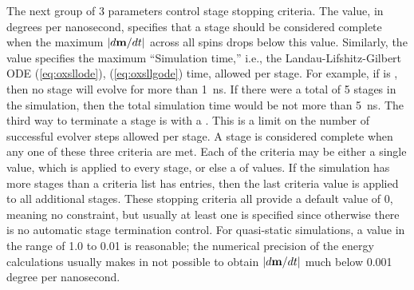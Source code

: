 \begin{description}
The next group of 3 parameters control stage stopping criteria.  The
 value, in degrees per nanosecond, specifies that a
stage should be considered complete when the maximum $|d\textbf{m}/dt|$ across
all spins drops below this value.  Similarly, the
 value specifies the maximum ``Simulation
time,'' i.e., the Landau-Lifshitz-Gilbert ODE (\ref{eq:oxsllode}),
(\ref{eq:oxsllgode}) time, allowed per stage.  For example, if
 is
, then no stage will evolve for more than
1~ns.  If there were a total of 5 stages in the simulation, then the
total simulation time would be not more than 5~ns.  The third way to
terminate a stage is with a .  This is
a limit on the number of successful evolver steps allowed per stage.  A
stage is considered complete when any one of these three criteria are
met.  Each of the criteria may be either a single value, which is
applied to every stage, or else a
 of values.  If the
simulation has more stages than a criteria list has entries, then the
last criteria value is applied to all additional stages.  These stopping
criteria all provide a default value of 0, meaning no constraint, but
usually at least one is specified since otherwise there is no automatic
stage termination control.  For quasi-static simulations, a
 value in the range of 1.0 to 0.01 is reasonable;
the numerical precision of the energy calculations usually makes in not
possible to obtain $|d\textbf{m}/dt|$ much below 0.001 degree per nanosecond.



\end{description}
